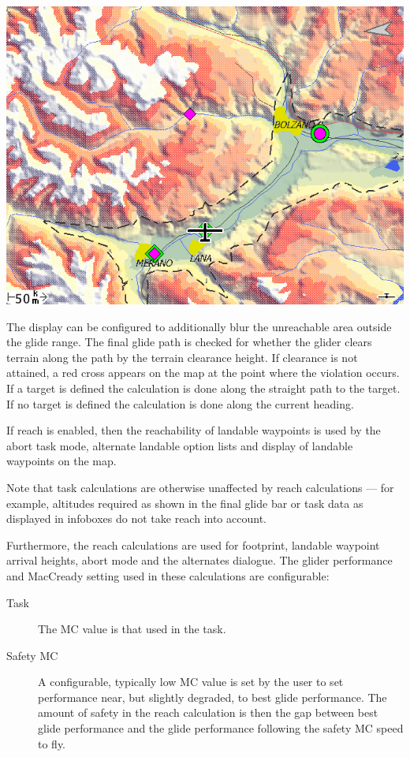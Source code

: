 \begin{description}
\begin{center}
\includegraphics[angle=0,width=0.8\linewidth,keepaspectratio='true']{figures/reach2.png}
\end{center}

\end{description}

The display can be configured to additionally blur the unreachable area
outside the glide range. 
The final glide path is checked for whether the glider clears terrain along
the path by the terrain clearance height.  If clearance is not attained, a red
cross appears on the map at the point where the violation occurs. If a target is
defined the calculation is done along the straight path to the target. If no 
target is defined the calculation is done along the current heading.

If reach is enabled, then the reachability of landable waypoints is used
by the abort task mode, alternate landable option lists and display of
landable waypoints on the map.

Note that task calculations are otherwise unaffected by reach
calculations --- for example, altitudes required as shown in the final
glide bar or task data as displayed in infoboxes do not take reach into account.

Furthermore, the reach calculations are used for footprint, landable
waypoint arrival heights, abort mode and the alternates dialogue.  The glider
performance and MacCready setting used in these calculations are configurable:
\begin{description}
\item[Task] The MC value is that used in the task.
\item[Safety MC] A configurable, typically low MC value is set by the user to set
  performance near, but slightly degraded, to best glide performance. The amount of safety 
  in the reach calculation is then the gap between best glide performance and the glide
  performance following the safety MC speed to fly. 
\end{description}


